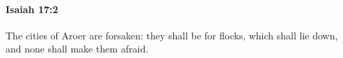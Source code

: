 
		\paragraph{Isaiah 17:2} %
			\label{ISAIAH-17-2}

			The cities of Aroer are forsaken: they shall be for flocks, which shall lie down, and none shall make them afraid.


